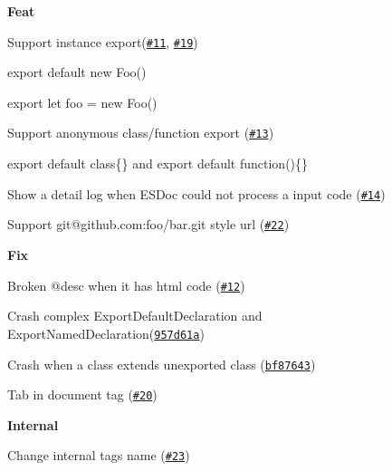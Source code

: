 \begin{DoxyItemize}
\item {\bfseries Feat}
\begin{DoxyItemize}
\item Support instance export(\href{https://github.com/h13i32maru/esdoc/issues/11}{\tt \#11}, \href{https://github.com/h13i32maru/esdoc/issues/19}{\tt \#19})
\begin{DoxyItemize}
\item {\ttfamily export default new Foo()}
\item {\ttfamily export let foo = new Foo()}
\end{DoxyItemize}
\item Support anonymous class/function export (\href{https://github.com/h13i32maru/esdoc/issues/13}{\tt \#13})
\begin{DoxyItemize}
\item {\ttfamily export default class\{\}} and {\ttfamily export default function()\{\}}
\end{DoxyItemize}
\item Show a detail log when E\+S\+Doc could not process a input code (\href{https://github.com/h13i32maru/esdoc/issues/14}{\tt \#14})
\item Support {\ttfamily git@github.\+com\+:foo/bar.\+git} style url (\href{https://github.com/h13i32maru/esdoc/issues/22}{\tt \#22})
\end{DoxyItemize}
\item {\bfseries Fix}
\begin{DoxyItemize}
\item Broken {\ttfamily @desc} when it has html code (\href{https://github.com/h13i32maru/esdoc/issues/12}{\tt \#12})
\item Crash complex {\ttfamily Export\+Default\+Declaration} and {\ttfamily Export\+Named\+Declaration}(\href{https://github.com/h13i32maru/esdoc/commit/957d61a8febb4fe3dda4d65bae8dc1cbc210250c}{\tt 957d61a})
\item Crash when a class extends unexported class (\href{https://github.com/h13i32maru/esdoc/commit/bf876430c49937932b2ba07602363b6927f211cc}{\tt bf87643})
\item Tab in document tag (\href{https://github.com/h13i32maru/esdoc/pull/20}{\tt \#20})
\end{DoxyItemize}
\item {\bfseries Internal}
\begin{DoxyItemize}
\item Change internal tags name (\href{https://github.com/h13i32maru/esdoc/issues/23}{\tt \#23})
\end{DoxyItemize}
\end{DoxyItemize}

